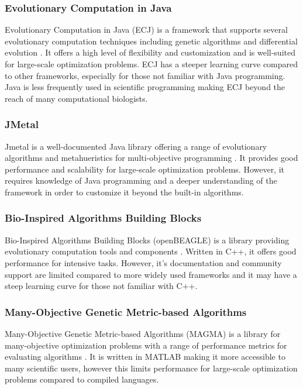 \documentclass[12pt]{report}
\begin{document}
\subsubsection{Evolutionary Computation in Java}
Evolutionary Computation in Java (ECJ) is a framework that supports several evolutionary computation techniques including genetic algorithms and differential evolution \cite{Luke1998ECJSoftware}. It offers a high level of flexibility and customization and is well-suited for large-scale optimization problems. 
ECJ has a steeper learning curve compared to other frameworks, especially for those not familiar with Java programming. Java is less frequently used in scientific programming making ECJ beyond the reach of many computational biologists. 

\subsubsection{JMetal}
Jmetal is a well-documented Java library offering a range of evolutionary algorithms and metahueristics for multi-objective programming \cite{Durillo2011}. It provides good performance and scalability for large-scale optimization problems. However, it requires knowledge of Java programming and a deeper understanding of the framework in order to customize it beyond the built-in algorithms. 

\subsubsection{Bio-Inspired Algorithms Building Blocks}
Bio-Inspired Algorithms Building Blocks (openBEAGLE) is a library providing evolutionary computation tools and components \cite{Gagne2006}. Written in C++, it offers good performance for  intensive tasks. However, it's documentation and community support are limited compared to more widely used frameworks and it may have a steep learning curve for those not familiar with C++.

\subsubsection{Many-Objective Genetic Metric-based Algorithms}
Many-Objective Genetic Metric-based Algorithms (MAGMA) is a library for many-objective optimization problems with a range of performance metrics for evaluating algorithms \cite{Wang2023}. It is written in MATLAB making it more accessible to many scientific users, however this limits performance for large-scale optimization problems compared to compiled languages.
\end{document}
